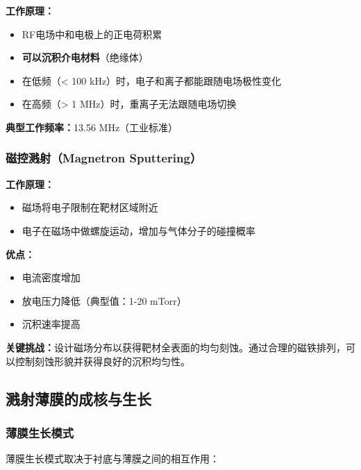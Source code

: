 \documentclass[UTF8,12pt,a4paper]{ctexart}
\begin{document}
\textbf{工作原理：}
\begin{itemize}
    \item RF电场中和电极上的正电荷积累
    \item \textbf{可以沉积介电材料}（绝缘体）
    \item 在低频（< 100 kHz）时，电子和离子都能跟随电场极性变化
    \item 在高频（> 1 MHz）时，重离子无法跟随电场切换
\end{itemize}

\textbf{典型工作频率：}13.56 MHz（工业标准）

\subsubsection{磁控溅射（Magnetron Sputtering）}

\textbf{工作原理：}
\begin{itemize}
    \item 磁场将电子限制在靶材区域附近
    \item 电子在磁场中做螺旋运动，增加与气体分子的碰撞概率
\end{itemize}

\textbf{优点：}
\begin{itemize}
    \item 电流密度增加
    \item 放电压力降低（典型值：1-20 mTorr）
    \item 沉积速率提高
\end{itemize}

\textbf{关键挑战：}设计磁场分布以获得靶材全表面的均匀刻蚀。通过合理的磁铁排列，可以控制刻蚀形貌并获得良好的沉积均匀性。

\subsection{溅射薄膜的成核与生长}

\subsubsection{薄膜生长模式}

薄膜生长模式取决于衬底与薄膜之间的相互作用：
\end{document}
